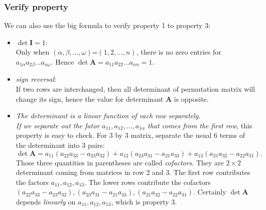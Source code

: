 \subsubsection{Verify property}
We can also use the big formula to verify property 1 to property 3:
\begin{itemize}
\item $\det\bm I=1$:\\
Only when $(\alpha,\beta,\dots,\omega)$=$(1,2,\dots,n)$, there is no zero entries for $a_{1\alpha}a_{2\beta}\dots a_{n\omega}$. Hence $\det\bm A=a_{11}a_{22}\dots a_{nn}=1$.
\item \emph{sign reversal}:\\
If two rows are interchanged, then all determinant of permutation matrix will change its sign, hence the value for determinant $\bm A$ is opposite.
\item \emph{The determinant is a linear function of each row separately}.\\
\emph{If we separate out the fator $a_{11},a_{12},\dots,a_{1\alpha}$ that comes from the first row}, this property is easy to check. For 3 by 3 matrix, separate the usual 6 terms of the determinant into 3 pairs:
\[
\det\bm A=a_{11}(a_{22}a_{33}-a_{23}a_{32})+a_{12}(a_{23}a_{31}-a_{21}a_{33})+a_{13}(a_{21}a_{32}-a_{22}a_{31}).
\]
Those three quantities in parentheses are called \emph{cofactors}. They are $2\times 2$ determinant coming from matrices in row 2 and 3. The first row contributes the factors $a_{11},a_{12},a_{13}$. The lower rows contribute the cofactors $(a_{22}a_{33}-a_{23}a_{32}),(a_{23}a_{31}-a_{21}a_{33}),(a_{21}a_{32}-a_{22}a_{31})$. Certainly $\det\bm A$ depends \emph{linearly} on $a_{11},a_{12},a_{13}$, which is property 3.
\end{itemize}
